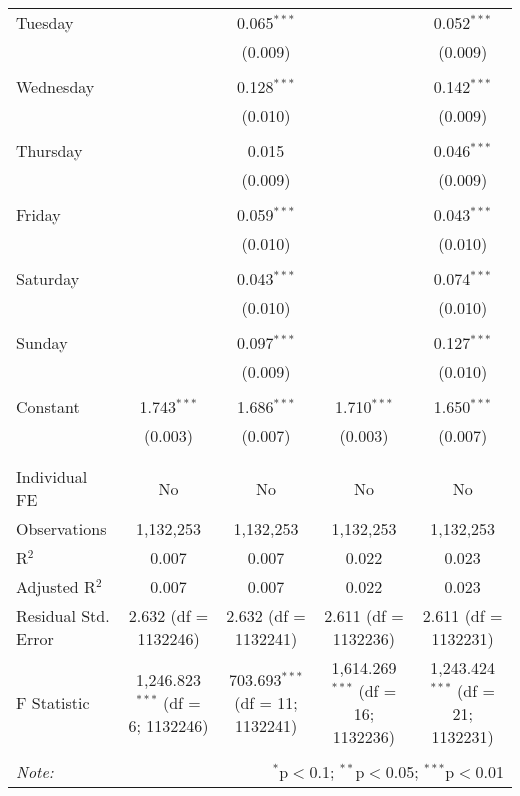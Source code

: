 \documentclass[
]{article}
\begin{document}
\begin{table}[!htbp]
{\begin{tabular}{@{\extracolsep{5pt}}lcccc}
 Tuesday &  & 0.065$^{***}$ &  & 0.052$^{***}$ \\ 
  &  & (0.009) &  & (0.009) \\ 
  & & & & \\ 
 Wednesday &  & 0.128$^{***}$ &  & 0.142$^{***}$ \\ 
  &  & (0.010) &  & (0.009) \\ 
  & & & & \\ 
 Thursday &  & 0.015 &  & 0.046$^{***}$ \\ 
  &  & (0.009) &  & (0.009) \\ 
  & & & & \\ 
 Friday &  & 0.059$^{***}$ &  & 0.043$^{***}$ \\ 
  &  & (0.010) &  & (0.010) \\ 
  & & & & \\ 
 Saturday &  & 0.043$^{***}$ &  & 0.074$^{***}$ \\ 
  &  & (0.010) &  & (0.010) \\ 
  & & & & \\ 
 Sunday &  & 0.097$^{***}$ &  & 0.127$^{***}$ \\ 
  &  & (0.009) &  & (0.010) \\ 
  & & & & \\ 
 Constant & 1.743$^{***}$ & 1.686$^{***}$ & 1.710$^{***}$ & 1.650$^{***}$ \\ 
  & (0.003) & (0.007) & (0.003) & (0.007) \\ 
  & & & & \\ 
\hline \\[-1.8ex] 
Individual FE & No & No & No & No \\ 
Observations & 1,132,253 & 1,132,253 & 1,132,253 & 1,132,253 \\ 
R$^{2}$ & 0.007 & 0.007 & 0.022 & 0.023 \\ 
Adjusted R$^{2}$ & 0.007 & 0.007 & 0.022 & 0.023 \\ 
Residual Std. Error & 2.632 (df = 1132246) & 2.632 (df = 1132241) & 2.611 (df = 1132236) & 2.611 (df = 1132231) \\ 
F Statistic & 1,246.823$^{***}$ (df = 6; 1132246) & 703.693$^{***}$ (df = 11; 1132241) & 1,614.269$^{***}$ (df = 16; 1132236) & 1,243.424$^{***}$ (df = 21; 1132231) \\ 
\hline 
\hline \\[-1.8ex] 
\textit{Note:}  & \multicolumn{4}{r}{$^{*}$p$<$0.1; $^{**}$p$<$0.05; $^{***}$p$<$0.01} \\ 
\end{tabular}
} 
\end{table} 
\newpage
\end{document}
